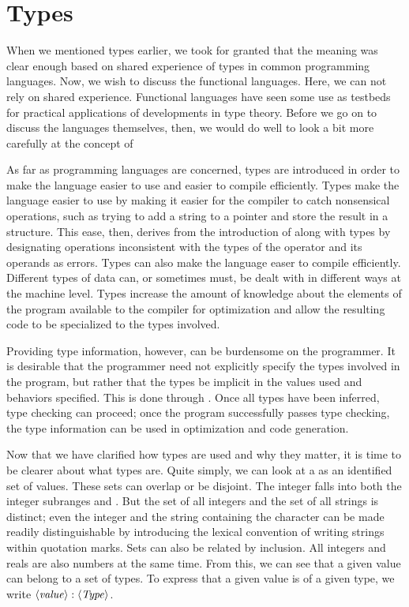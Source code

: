 \section{Types}
When we mentioned types earlier, we took for granted that the meaning was clear enough based on shared experience of types in common programming languages. Now, we wish to discuss the functional languages. Here, we can not rely on shared experience. Functional languages have seen some use as testbeds for practical applications of developments in type theory. Before we go on to discuss the languages themselves, then, we would do well to look a bit more carefully at the concept of 

As far as programming languages are concerned, types are introduced in order to make the language easier to use and easier to compile efficiently. Types make the language easier to use by making it easier for the compiler to catch nonsensical operations, such as trying to add a string to a pointer and store the result in a structure. This ease, then, derives from the introduction of  along with types by designating operations inconsistent with the types of the operator and its operands as errors. Types can also make the language easer to compile efficiently. Different types of data can, or sometimes must, be dealt with in different ways at the machine level. Types increase the amount of knowledge about the elements of the program available to the compiler for optimization and allow the resulting code to be specialized to the types involved.

Providing type information, however, can be burdensome on the programmer. It is desirable that the programmer need not explicitly specify the types involved in the program, but rather that the types be implicit in the values used and behaviors specified. This is done through . Once all types have been inferred, type checking can proceed; once the program successfully passes type checking, the type information can be used in optimization and code generation.

Now that we have clarified how types are used and why they matter, it is time to be clearer about what types are. Quite simply, we can look at a  as an identified set of values. These sets can overlap or be disjoint. The integer  falls into both the integer subranges  and . But the set of all integers and the set of all strings is distinct; even the integer  and the string  containing the character  can be made readily distinguishable by introducing the lexical convention of writing strings within quotation marks. Sets can also be related by inclusion. All integers and reals are also numbers at the same time. From this, we can see that a given value can belong to a set of types. To express that a given value is of a given type, we write $\langle \text{\textit{value}} \rangle : \langle \text{\textit{Type}} \rangle$.

